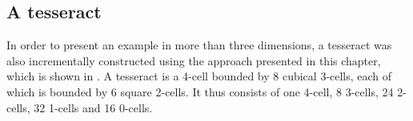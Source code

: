 \subsection*{A tesseract}

In order to present an example in more than three dimensions, a tesseract was also incrementally constructed using the approach presented in this chapter, which is shown in .
A tesseract is a 4-cell bounded by 8 cubical 3-cells, each of which is bounded by 6 square 2-cells.
It thus consists of one 4-cell, 8 3-cells, 24 2-cells, 32 1-cells and 16 0-cells.
